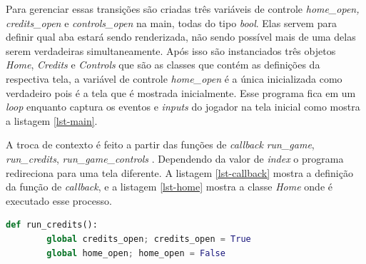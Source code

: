
Para gerenciar essas transições são criadas três variáveis de controle \textit{home\_open, credits\_open} e \textit{controls\_open} na main, todas do tipo \textit{bool}. Elas servem para definir qual aba estará sendo renderizada, não sendo possível mais de uma delas serem verdadeiras simultaneamente. Após isso são instanciados três objetos \textit{Home}, \textit{Credits} e \textit{Controls} que são as classes que contém as definições da respectiva tela, a variável de controle \textit{home\_open} é a única inicializada como verdadeiro pois é a tela que é mostrada inicialmente. Esse programa fica em um \textit{loop} enquanto captura os eventos e \textit{inputs} do jogador na tela inicial como mostra a listagem \ref{lst-main}.


A troca de contexto é feito a partir das funções de \textit{callback} \textit{run\_game}, \textit{run\_credits}, \textit{run\_game\_controls} 
. Dependendo da valor de \textit{index} o programa redireciona para uma tela diferente. A listagem \ref{lst-callback} mostra a definição da função de \textit{callback}, e a listagem \ref{lst-home}  mostra a classe \textit{Home} onde é executado esse processo.
\begin{lstlisting}[label= lst-callback,language=Python,breaklines, caption= Função de \textit{callback} responsávél por alterar a variável de controle.]
    def run_credits():
        global credits_open; credits_open = True
        global home_open; home_open = False
\end{lstlisting}

